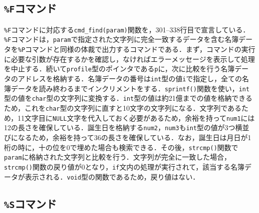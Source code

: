 \subsection{\texttt{\%F}コマンド}

\verb|%F|コマンドに対応する\verb|cmd_find(param)|関数を，301--338行目で宣言している．\verb|%F|コマンドは，\verb|param|で指定された文字列に完全一致するデータを含む名簿データを\verb|%P|コマンドと同様の体裁で出力するコマンドである．まず，コマンドの実行に必要な引数が存在するかを確認し，なければエラーメッセージを表示して処理を中止する．続いて\verb|profile|型のポインタである\verb|p|に，次に比較を行う名簿データのアドレスを格納する．名簿データの番号は\verb|int|型の値\verb|i|で指定し，全ての名簿データを読み終わるまでインクリメントをする．\verb|sprintf()|関数を使い，\verb|int|型の値を\verb|char|型の文字列に変換する．\verb|int|型の値は約21億までの値を格納できるため，これを\verb|char|型の文字列に直すと10文字の文字列になる．文字列であるため，11文字目に\verb|NULL|文字を代入しておく必要があるため，余裕を持って\verb|num1|には12の長さを確保している．誕生日を格納する\verb|num2|，\verb|num3|も\verb|int|型の値が3つ横並びになるため，余裕を持って36の長さを確保している．なお，誕生日は月日が1桁の時に，十の位を0で埋めた場合も検索できる．その後，\verb|strcmp()|関数で\verb|param|に格納された文字列と比較を行う．文字列が完全に一致した場合，\verb|strcmp()|関数の戻り値が0となり，\verb|if|文内の処理が実行されて，該当する名簿データが表示される．\verb|void|型の関数であるため，戻り値はない．

\subsection{\texttt{\%S}コマンド}

